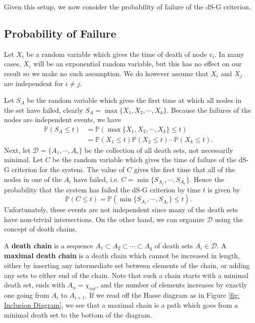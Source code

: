 \documentclass[10pt,twocolumn]{article} \usepackage{amsmath,epsf,amssymb,cite,pifont,amsthm, mathrsfs,epsfig,  bbm, amsthm,  setspace}
\newcommand{\DD}{\mathcal D}
\renewcommand{\P}{\mathbb P}
\renewcommand{\1}{\mathbbm{1}}
\newcommand{\death}{r}
\newcommand{\sizeset}{k}
\newcommand{\chiint}{n}
\begin{document}
Given this setup, we now consider the probability of failure of the dS-G criterion.


\subsection{Probability of Failure} \label{S: Probability of Failure}

Let $X_i$ be a random variable which gives the time of death of node $v_i$.
In many cases, $X_i$ will be an exponential random variable,
but this has no effect on our result so we make no such assumption.
We do however assume that $X_i$ and $X_j$ are independent for $i \neq j$.

Let $S_A$ be the random variable which gives the first time at which all nodes in the set have
failed,
clearly $S_A=\max\{X_1, X_2, \cdots, X_\sizeset\}$.
Because the failures of the nodes are independent events, we have
\begin{align*}
\P(S_A\leq t) &= \P(\max\{X_1,X_2,\cdots, X_\sizeset\}\leq t)\\
&= \P(X_1\leq t)\P(X_2\leq t)\cdots \P(X_\sizeset \leq t).\end{align*}
Next, let $\DD = \{A_1, \cdots, A_\death \}$ be the collection of all death sets, not necessarily minimal.
Let $C$ be the random variable which gives the time of failure of the dS-G criterion for the system.
The value of $C$ gives the first time that all of the nodes in one of the $A_i$ have failed,
i.e. $C=\min\{S_{A_1},\cdots, S_{A_\death}\}$.
Hence the probability that the system has failed the dS-G criterion by time $t$ is given by
\begin{equation*}
	\P(C\leq t)=\P(\min\{S_{A_1},\cdots,S_{A_\death}\}\leq t).
\end{equation*}
Unfortunately, these events are not independent since many of the death sets have non-trivial intersections.
On the other hand, we can organize $\DD$ using the concept of death chains.

A \textbf{death chain} is a sequence
$A_1 \subset A_2 \subset \cdots \subset A_q$ of death sets $A_i \in \DD$.
A \textbf{maximal death chain} is a death chain which cannot be increased in length, either by inserting any
intermediate set between elements of the chain, or adding any sets to either end of the chain.
Note that such a chain starts with a minimal death set,
ends with $A_\chiint = \chi_{int}$, and the number of elements increases by exactly one going from
$A_i$ to $A_{i+1}$.
If we read off the Hasse diagram as in Figure \ref{fig: Inclusion Diagram},
we see that a maximal chain is a path which goes from a minimal death set to the bottom of the diagram.
\end{document}
